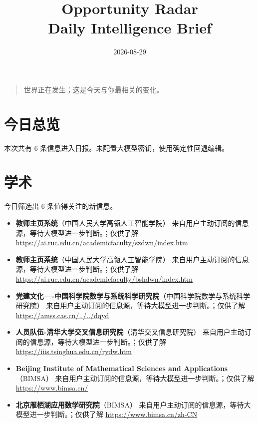 \documentclass[11pt]{ctexart}
\title{Opportunity Radar\\Daily Intelligence Brief}
\date{2026-08-29}
\begin{document}
\maketitle
\begin{quote}\Large 世界正在发生；这是今天与你最相关的变化。\end{quote}
\section*{今日总览}
本次共有 6 条信息进入日报。未配置大模型密钥，使用确定性回退编辑。
\section*{学术}
今日筛选出 6 条值得关注的新信息。
\begin{itemize}
\item \textbf{教师主页系统}（中国人民大学高瓴人工智能学院） 来自用户主动订阅的信息源，等待大模型进一步判断。；仅供了解 \url{https://ai.ruc.edu.cn/academicfaculty/szdwn/index.htm}
\item \textbf{教师主页系统}（中国人民大学高瓴人工智能学院） 来自用户主动订阅的信息源，等待大模型进一步判断。；仅供了解 \url{https://ai.ruc.edu.cn/academicfaculty/bshdwn/index.htm}
\item \textbf{党建文化----中国科学院数学与系统科学研究院}（中国科学院数学与系统科学研究院） 来自用户主动订阅的信息源，等待大模型进一步判断。；仅供了解 \url{https://amss.cas.cn/../../dqyd}
\item \textbf{人员队伍-清华大学交叉信息研究院}（清华交叉信息研究院） 来自用户主动订阅的信息源，等待大模型进一步判断。；仅供了解 \url{https://iiis.tsinghua.edu.cn/rydw.htm}
\item \textbf{Beijing Institute of Mathematical Sciences and Applications}（BIMSA） 来自用户主动订阅的信息源，等待大模型进一步判断。；仅供了解 \url{https://www.bimsa.cn/}
\item \textbf{北京雁栖湖应用数学研究院}（BIMSA） 来自用户主动订阅的信息源，等待大模型进一步判断。；仅供了解 \url{https://www.bimsa.cn/zh-CN}
\end{itemize}
\end{document}
